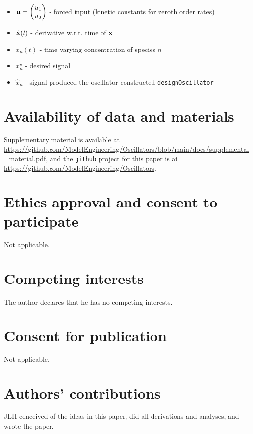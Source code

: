 \documentclass{bmcart}
\begin{document}
\begin{backmatter}
\begin{itemize}
\item ${\bf u} = \begin{pmatrix} u_1 \\ u_2 \end{pmatrix}$ - forced input (kinetic constants for zeroth order
rates)
\item $\dot{\bf x} (t)$ - derivative w.r.t. time of ${\bf x}$
\item $x_n(t)$
 - time varying concentration of species $n$
\item $x_n^{\star}$ - desired signal
\item $\hat{x}_n$ - signal produced the oscillator constructed {\tt designOscillator}
\end{itemize}



\section*{Availability of data and materials}%
Supplementary material is available at
\url{https://github.com/ModelEngineering/Oscillators/blob/main/docs/supplemental_material.pdf}, and the {\tt github} project for this paper is at
\url{https://github.com/ModelEngineering/Oscillators}.


\section*{Ethics approval and consent to participate}
Not applicable.

\section*{Competing interests}
The author declares that he has no competing interests.

\section*{Consent for publication}%
Not applicable.

\section*{Authors' contributions}
JLH conceived of the ideas in this paper, did all derivations and analyses, and wrote the paper.




\end{backmatter}
\end{document}
